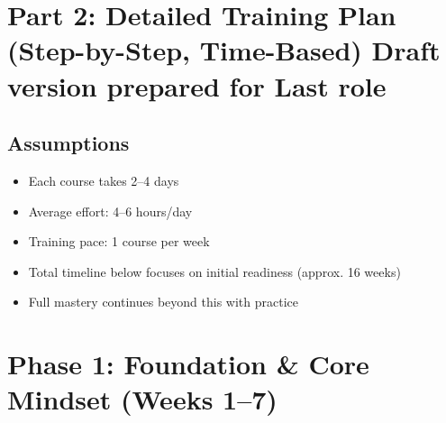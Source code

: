 \documentclass[12pt]{article}
\begin{document}
	\section*{Part 2: Detailed Training Plan (Step-by-Step, Time-Based) Draft version prepared for Last role}
	
	\subsection*{Assumptions}
	\begin{itemize}
		\item Each course takes 2–4 days
		\item Average effort: 4–6 hours/day
		\item Training pace: 1 course per week
		\item Total timeline below focuses on initial readiness (approx. 16 weeks)
		\item Full mastery continues beyond this with practice
	\end{itemize}
	
	\vspace{0.5cm}
	
	\section*{Phase 1: Foundation \& Core Mindset (Weeks 1–7)}
	
\end{document}
